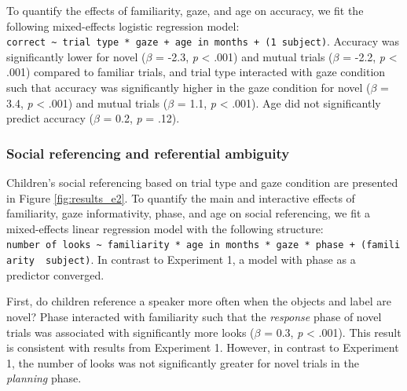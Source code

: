 \documentclass[a4paper,man,apacite,floatsintext]{apa6}
\begin{document}
To quantify the effects of familiarity, gaze, and age on accuracy, we
fit the following mixed-effects logistic regression model:
\texttt{correct\ \textasciitilde{}\ trial\ type\ *\ gaze\ +\ age\ in\ months\ +\ (1\textbar{}\ subject)}.
Accuracy was significantly lower for novel (\(\beta\) = -2.3, \emph{p}
\textless{} .001) and mutual trials (\(\beta\) = -2.2, \emph{p}
\textless{} .001) compared to familiar trials, and trial type interacted
with gaze condition such that accuracy was significantly higher in the
gaze condition for novel (\(\beta\) = 3.4, \emph{p} \textless{} .001)
and mutual trials (\(\beta\) = 1.1, \emph{p} \textless{} .001). Age did
not significantly predict accuracy (\(\beta\) = 0.2, \emph{p} = .12).

\subsubsection{Social referencing and referential
ambiguity}\label{social-referencing-and-referential-ambiguity}

Children's social referencing based on trial type and gaze condition are
presented in Figure \ref{fig:results_e2}. To quantify the main and
interactive effects of familiarity, gaze informativity, phase, and age
on social referencing, we fit a mixed-effects linear regression model
with the following structure:
\texttt{number\ of\ looks\ \textasciitilde{}\ familiarity\ *\ age\ in\ months\ *\ gaze\ *\ phase\ +\ (familiarity\ \textbar{}\ subject)}.
In contrast to Experiment 1, a model with phase as a predictor
converged.

First, do children reference a speaker more often when the objects and
label are novel? Phase interacted with familiarity such that the
\emph{response} phase of novel trials was associated with significantly
more looks (\(\beta\) = 0.3, \emph{p} \textless{} .001). This result is
consistent with results from Experiment 1. However, in contrast to
Experiment 1, the number of looks was not significantly greater for
novel trials in the \emph{planning} phase.
\end{document}
